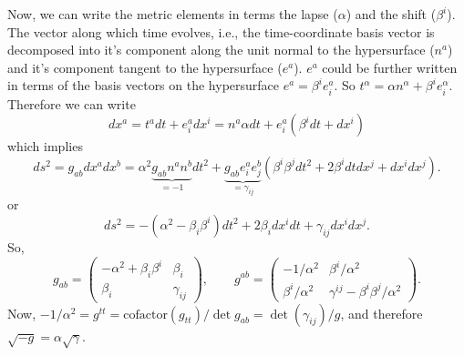 \documentclass[10pt]{article}
\begin{document}
\begin{enumerate}
\begin{equation}
  \end{equation}
  Now, we can write the metric elements in terms the lapse ($\alpha$) and the shift ($\beta^i$). The vector along which time evolves, i.e., the time-coordinate basis vector is decomposed into it's component along the unit normal to the hypersurface ($n^a$) and it's component tangent to the hypersurface ($e^a$). $e^a$ could be further written in terms of the basis vectors on the hypersurface $e^a = \beta^i e^a_i$. So $t^\alpha = \alpha n^\alpha + \beta^i e^\alpha_i$. Therefore we can write
  \begin{equation}
    \label{eq:dxalpha}
    dx^a = t^a dt + e^a_i dx^i = n^a \alpha dt + e^a_i (\beta^i dt + dx^i)
  \end{equation}
  which implies
  \begin{equation}
    \label{eq:ds2}
    ds^2  = g_{ab}dx^a dx^b = \alpha^2\underbrace{g_{ab}n^a n^b}_{=-1} dt^2 +  \underbrace{g_{ab}e^a_i e^b_j}_{=\gamma_{ij}}(\beta^{i}\beta^{j}dt^2 + 2\beta^idtdx^j + dx^i dx^j).
  \end{equation}
  or
  \begin{equation}
    \label{eq:line-element}
    \boxed{ds^2 = -(\alpha^2 - \beta_i \beta^i)dt^2 + 2\beta_idx^i dt + \gamma_{ij} dx^i dx^j.}
  \end{equation}
  So,
  \begin{equation}
    \label{eq:metric-in-alpha-beta}
    \boxed{g_{ab} =
    \begin{pmatrix}
      -\alpha^2 + \beta_i \beta^i & \beta_i \\
      \beta_i & \gamma_{ij}
    \end{pmatrix}}, \qquad g^{ab} =
    \begin{pmatrix}
      -{1/\alpha^2} & {\beta^i}/{\alpha^2}\\
      \beta^i/\alpha^2 & \gamma^{ij} - \beta^i\beta^j/\alpha^2
    \end{pmatrix}.
  \end{equation}
  Now, $ -1/\alpha^2 = g^{tt} = \textrm{cofactor}(g_{tt})/\det{g_{ab}} = \det(\gamma_{ij})/g$, and therefore $\boxed{\sqrt{-g} = \alpha \sqrt{\gamma}}$.
  

\end{enumerate}
\end{document}
